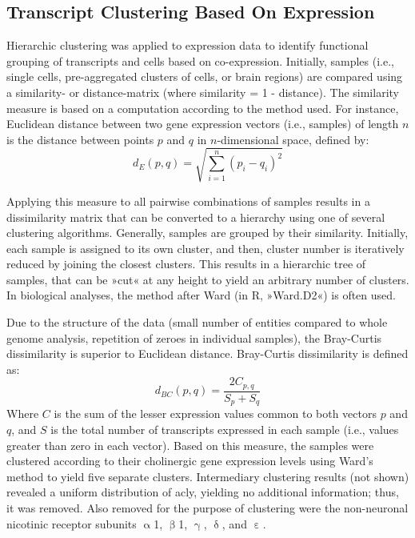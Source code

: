 \begin{method}

\subsection{Transcript Clustering Based On Expression}

Hierarchic clustering was applied to expression data to identify functional grouping of transcripts and cells based on co-expression. Initially, samples (i.e., single cells, pre-aggregated clusters of cells, or brain regions) are compared using a similarity- or distance-matrix (where similarity = \num{1} - distance). The similarity measure is based on a computation according to the method used. For instance, Euclidean distance between two gene expression vectors (i.e., samples) of length $n$ is the distance between points $p$ and $q$ in $n$-dimensional space, defined by: $$d_E(p, q) = \sqrt{\sum_{i=1}^{n} (p_{i}-q_{i})^2}$$

Applying this measure to all pairwise combinations of samples results in a dissimilarity matrix that can be converted to a hierarchy using one of several clustering algorithms. Generally, samples are grouped by their similarity. Initially, each sample is assigned to its own cluster, and then, cluster number is iteratively reduced by joining the closest clusters. This results in a hierarchic tree of samples, that can be »cut« at any height to yield an arbitrary number of clusters. In biological analyses, the method after Ward (in R, »Ward.D2«) is often used.\cite{Murtagh2014}

Due to the structure of the data (small number of entities compared to whole genome analysis, repetition of zeroes in individual samples), the Bray-Curtis dissimilarity\cite{Bray1957} is superior to Euclidean distance. Bray-Curtis dissimilarity is defined as: $$d_{BC}(p, q) = \frac{2C_{p, q}}{S_p+S_q}$$ Where $C$ is the sum of the lesser expression values common to both vectors $p$ and $q$, and $S$ is the total number of transcripts expressed in each sample (i.e., values greater than zero in each vector). Based on this measure, the samples were clustered according to their cholinergic gene expression levels using Ward's method to yield five separate clusters. Intermediary clustering results (not shown) revealed a uniform distribution of \ac{acly}, yielding no additional information; thus, it was removed. Also removed for the purpose of clustering were the non-neuronal nicotinic receptor subunits $\upalpha$\num{1}, $\upbeta$\num{1}, $\upgamma$, $\updelta$, and $\upepsilon$. 

\end{method}

